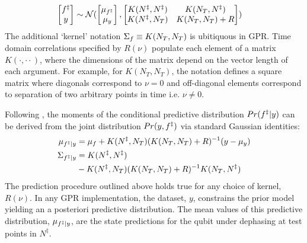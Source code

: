 \begin{align}
	\begin{bmatrix} f^{\ddagger} \\y \end{bmatrix} & \sim \mathcal{N} (\begin{bmatrix} \mu_{f^{\ddagger}} \\ \mu_y
	\end{bmatrix} , \begin{bmatrix}   K(N^{\ddagger},N^{\ddagger})&K(N_T,N^{\ddagger}) \\ K(N^{\ddagger},N_T) & K(N_T,N_T) + R \end{bmatrix} )
\end{align}
The additional `kernel' notation $\Sigma_f  \equiv K(N_T, N_T)$ is ubitiquous in GPR. Time domain correlations specified by $R(\nu)$ populate each element of a matrix $K(\cdot, \cdot \cdot)$, where the dimensions of the matrix depend on the vector length of each argument. For example, for $K(N_T,N_T)$, the notation defines a square matrix where diagonals correspond to $\nu=0$ and off-diagonal elements correspond to separation of two arbitrary points in time i.e. $\nu \neq 0 $. 

Following \cite{rasmussen2005gaussian}, the moments of the conditional predictive distribution $Pr(f^{\ddagger}|y)$ can be derived from the joint distribution $Pr(y,f^{\ddagger})$ via standard Gaussian identities:
\begin{align}
	\mu_{f^{\ddagger}|y} &= \mu_f + K(N^{\ddagger},N_T)(K(N_T,N_T) + R )^{-1} (y - \mu_y) \\
	\Sigma_{f^{\ddagger}|y} &= K(N^{\ddagger},N^{\ddagger}) \nonumber \\
	& - K(N^{\ddagger},N_T)(K(N_T, N_T) + R)^{-1}K(N_T,N^{\ddagger}) 
\end{align}
The prediction procedure outlined above holds true for any choice of kernel, $R(\nu)$. In any GPR implementation, the dataset, $y$, constrains the prior model yielding an a posteriori predictive distribution. The mean values of this predictive distribution, $\mu_{f^{\ddagger}|y}$, are the state predictions for the qubit under dephasing at test points in $N^{\ddagger}$.

